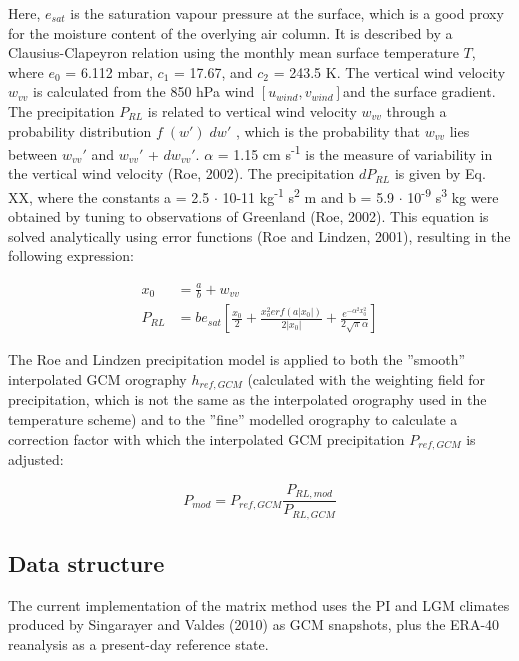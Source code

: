 \documentclass{article}
\begin{document}
Here, $e_{sat}$ is the saturation vapour pressure at the surface, which is a good proxy for the moisture content of the overlying air column. It is described by a Clausius-Clapeyron relation using the monthly mean surface temperature $T$, where $e_0$ = 6.112 mbar, $c_1$ = 17.67, and $c_2$ = 243.5 K. The vertical wind velocity $w_{vv}$ is calculated from the 850 hPa wind $[u_{wind},v_{wind}]$and the surface gradient. The precipitation $P_{RL}$ is related to vertical wind velocity $w_{vv}$ through a probability distribution $f 􏰁(w') 􏰂dw'$ , which is the probability that $w_{vv}$ lies between $w_{vv}'$ and $w_{vv}'$ + $dw_{vv}'$. $\alpha$ = 1.15 cm s\textsuperscript{-1} is the measure of variability in the vertical wind velocity (Roe, 2002). The precipitation $dP_{RL}$ is given by Eq. XX, where the constants a = 2.5 $\cdot$ 10-11 kg\textsuperscript{-1} s\textsuperscript{2} m and b = 5.9 $\cdot$ 10\textsuperscript{-9} s\textsuperscript{3} kg were obtained by tuning to observations of Greenland (Roe, 2002). This equation is solved analytically using error functions (Roe and Lindzen, 2001), resulting in the following expression:

\begin{align}
x_0 &= \frac{a}{b} + w_{vv} \\
P_{RL} &= b e_{sat} \left[ \frac{x_0}{2} + \frac{ x_o^2 erf( a |x_0| )}{2|x_0|} + \frac{e^{-\alpha^2 x_0^2}}{2 \sqrt{\pi} \alpha}\right]
\end{align}

The Roe and Lindzen precipitation model is applied to both the ''smooth'' interpolated GCM orography $h_{ref,GCM}$ (calculated with the weighting field for precipitation, which is not the same as the interpolated orography used in the temperature scheme) and to the ''fine'' modelled orography to calculate a correction factor with which the interpolated GCM precipitation $P_{ref,GCM}$ is adjusted:

\begin{equation}
P_{mod} = P_{ref,GCM} \frac{P_{RL,mod}}{P_{RL,GCM}}
\end{equation}

\newpage
\subsection{Data structure}

The current implementation of the matrix method uses the PI and LGM climates produced by Singarayer and Valdes (2010) as GCM snapshots, plus the ERA-40 reanalysis as a present-day reference state.
\end{document}
